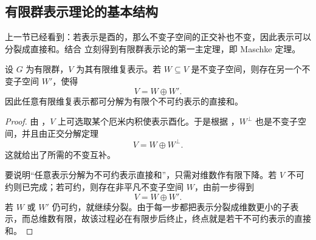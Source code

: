 \subsection{有限群表示理论的基本结构}
\label{sec:finite-group-structure}


上一节已经看到：若表示是酉的，那么不变子空间的正交补也不变，因此表示可以分裂成直接和。结合  立刻得到有限群表示论的第一主定理，即 Maschke 定理。

\begin{theorem}[Maschke 定理]
设 $G$ 为有限群，$V$ 为其有限维复表示。若 $W\subseteq V$ 是不变子空间，则存在另一个不变子空间 $W'$，使得
\[
V=W\oplus W'.
\]
因此任意有限维复表示都可分解为有限个不可约表示的直接和。
\label{thm:maschke}

\end{theorem}

\begin{proof}
由 ，$V$ 上可选取某个厄米内积使表示酉化。于是根据 ，$W^{\perp}$ 也是不变子空间，并且由正交分解定理
\[
V=W\oplus W^{\perp}.
\]
这就给出了所需的不变互补。

要说明“任意表示分解为不可约表示直接和”，只需对维数作有限下降。若 $V$ 不可约则已完成；若可约，则存在非平凡不变子空间 $W$，由前一步得到
\[
V=W\oplus W'.
\]
若 $W$ 或 $W'$ 仍可约，就继续分裂。由于每一步都把表示分裂成维数更小的子表示，而总维数有限，故该过程必在有限步后终止，终点就是若干不可约表示的直接和。
\end{proof}

